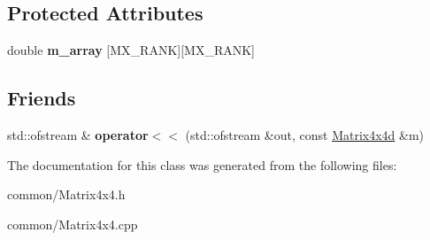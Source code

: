 \subsection*{Protected Attributes}
\begin{DoxyCompactItemize}
\item 
\mbox{\label{class_matrix4x4d_a83e2bb6d4ae55d8438de553a4716ac06}} 
double {\bfseries m\+\_\+array} \mbox{[}M\+X\+\_\+\+R\+A\+NK\mbox{]}\mbox{[}M\+X\+\_\+\+R\+A\+NK\mbox{]}
\end{DoxyCompactItemize}
\subsection*{Friends}
\begin{DoxyCompactItemize}
\item 
\mbox{\label{class_matrix4x4d_a95e0e03428f4cf3315e0666ed529cb27}} 
std\+::ofstream \& {\bfseries operator$<$$<$} (std\+::ofstream \&out, const \mbox{\hyperlink{class_matrix4x4d}{Matrix4x4d}} \&m)
\end{DoxyCompactItemize}


The documentation for this class was generated from the following files\+:\begin{DoxyCompactItemize}
\item 
common/Matrix4x4.\+h\item 
common/Matrix4x4.\+cpp\end{DoxyCompactItemize}
